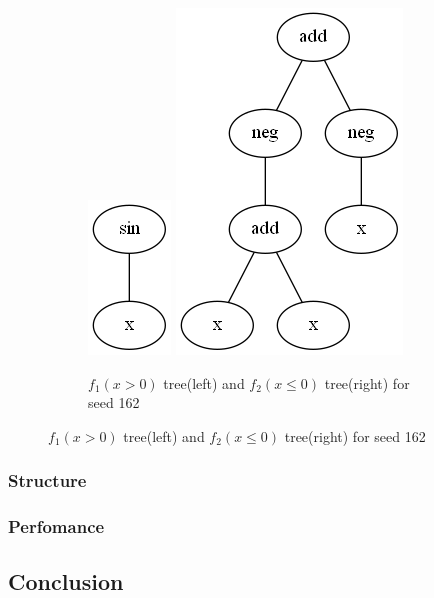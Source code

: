 \documentclass{article}
\begin{document}
\begin{figure}[h!]
	\centering
	\begin{subfigure}[b]{\linewidth}
		\includegraphics[width=0.5\linewidth]{ccgp_best_tree_162_1.png}
		\includegraphics[width=0.5\linewidth]{ccgp_best_tree_162_2.png}
		\caption{$f_1(x > 0)$ tree(left) and $f_2(x \le 0)$ tree(right) for seed 162}
	\end{subfigure}
\end{figure}
	
\subsubsection*{Structure}
\subsubsection*{Perfomance}
	
\subsection*{Conclusion}




\end{document}

